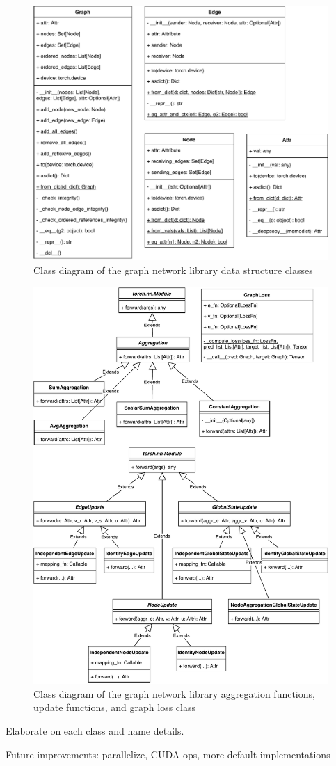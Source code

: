 \begin{figure}\centering
    \includegraphics[scale=0.65]{resources/graphnets-datastructs}
    \caption{Class diagram of the graph network library data structure classes}\label{fig:classdiagramgndatastructs}
\end{figure}

\begin{figure}\centering
    \includegraphics[scale=0.65]{resources/graphnets-functions}
    \caption{Class diagram of the graph network library aggregation functions, update functions, and graph loss class}\label{fig:classdiagramgnfunctions}
\end{figure}

Elaborate on each class and name details.

Future improvements: parallelize, CUDA ops, more default implementations
